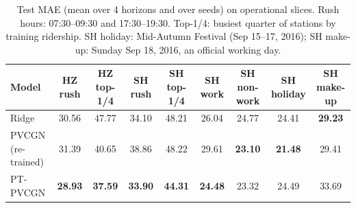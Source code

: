 \begin{table}[t]
\centering
\caption{Test MAE (mean over 4 horizons and over seeds) on operational slices. Rush hours: 07:30--09:30 and 17:30--19:30. Top-1/4: busiest quarter of stations by training ridership. SH holiday: Mid-Autumn Festival (Sep 15--17, 2016); SH make-up: Sunday Sep 18, 2016, an official working day.}
\label{tab:slices}
\footnotesize
\begin{tabular}{lcccccccc}
\toprule
Model & HZ rush & HZ top-1/4 & SH rush & SH top-1/4 & SH work & SH non-work & SH holiday & SH make-up \\
\midrule
Ridge & 30.56 & 47.77 & 34.10 & 48.21 & 26.04 & 24.77 & 24.41 & \textbf{29.23} \\
PVCGN (re-trained) & 31.39 & 40.65 & 38.86 & 48.22 & 29.61 & \textbf{23.10} & \textbf{21.48} & 29.41 \\
PT-PVCGN & \textbf{28.93} & \textbf{37.59} & \textbf{33.90} & \textbf{44.31} & \textbf{24.48} & 23.32 & 24.49 & 33.69 \\
\bottomrule
\end{tabular}
\end{table}